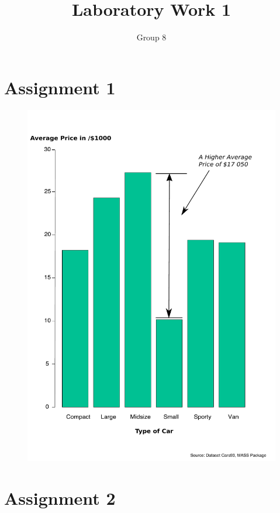 \documentclass[11pt]{article}
\begin{document}
\author{Group 8}
\title{Laboratory Work 1}
\maketitle

\section{Assignment 1}

\begin{figure}[H]
  \centering
   \includegraphics[scale=0.5]{Assignment_1.pdf}
\end{figure}


\section{Assignment 2}
\end{document}
